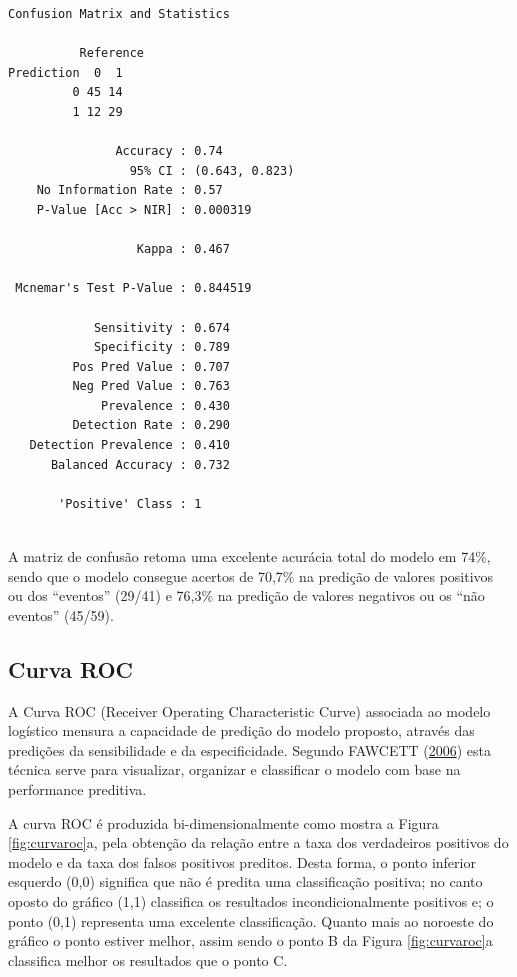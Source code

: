 \documentclass[12pt,brazil,oneside]{book}
\begin{document}
\begin{verbatim}
Confusion Matrix and Statistics

          Reference
Prediction  0  1
         0 45 14
         1 12 29
                                        
               Accuracy : 0.74          
                 95% CI : (0.643, 0.823)
    No Information Rate : 0.57          
    P-Value [Acc > NIR] : 0.000319      
                                        
                  Kappa : 0.467         
                                        
 Mcnemar's Test P-Value : 0.844519      
                                        
            Sensitivity : 0.674         
            Specificity : 0.789         
         Pos Pred Value : 0.707         
         Neg Pred Value : 0.763         
             Prevalence : 0.430         
         Detection Rate : 0.290         
   Detection Prevalence : 0.410         
      Balanced Accuracy : 0.732         
                                        
       'Positive' Class : 1             
                                        
\end{verbatim}

A matriz de confusão retoma uma excelente acurácia total do modelo em 74\%, sendo que o modelo consegue acertos de 70,7\% na predição de valores positivos ou dos ``eventos'' (29/41) e 76,3\% na predição de valores negativos ou os ``não eventos'' (45/59).

\hypertarget{curva-roc}{%
\subsection{Curva ROC}\label{curva-roc}}

A Curva ROC (Receiver Operating Characteristic Curve) associada ao modelo logístico mensura a capacidade de predição do modelo proposto, através das predições da sensibilidade e da especificidade. Segundo FAWCETT (\protect\hyperlink{ref-Fawcett2006}{2006}) esta técnica serve para visualizar, organizar e classificar o modelo com base na performance preditiva.

A curva ROC é produzida bi-dimensionalmente como mostra a Figura \ref{fig:curvaroc}a, pela obtenção da relação entre a taxa dos verdadeiros positivos do modelo e da taxa dos falsos positivos preditos. Desta forma, o ponto inferior esquerdo (0,0) significa que não é predita uma classificação positiva; no canto oposto do gráfico (1,1) classifica os resultados incondicionalmente positivos e; o ponto (0,1) representa uma excelente classificação. Quanto mais ao noroeste do gráfico o ponto estiver melhor, assim sendo o ponto B da Figura \ref{fig:curvaroc}a classifica melhor os resultados que o ponto C.
\end{document}

